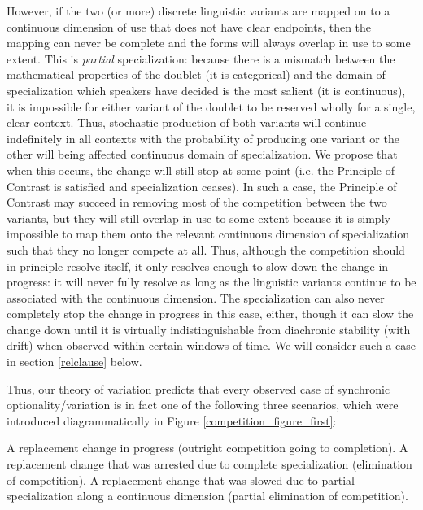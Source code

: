 However, if the two (or more) discrete linguistic variants are mapped on to a continuous dimension of use that does not have clear endpoints, then the mapping can never be complete and the forms will always overlap in use to some extent.
This is \textsl{partial} specialization: because there is a mismatch between the mathematical properties of the doublet (it is categorical) and the domain of specialization which speakers have decided is the most salient (it is continuous), it is impossible for either variant of the doublet to be reserved wholly for a single, clear context.
Thus, stochastic production of both variants will continue indefinitely in all contexts with the probability of producing one variant or the other will being affected continuous domain of specialization.
We propose that when this occurs, the change will still stop at some point (i.e. the Principle of Contrast is satisfied and specialization ceases).
In such a case, the Principle of Contrast may succeed in removing most of the competition between the two variants, but they will still overlap in use to some extent because it is simply impossible to map them onto the relevant continuous dimension of specialization such that they no longer compete at all.
Thus, although the competition should in principle resolve itself, it only resolves enough to slow down the change in progress: it will never fully resolve as long as the linguistic variants continue to be associated with the continuous dimension.
The specialization can also never completely stop the change in progress in this case, either, though it can slow the change down until it is virtually indistinguishable from diachronic stability (with drift) when observed within certain windows of time.
We will consider such a case in section \ref{relclause} below.

Thus, our theory of variation predicts that every observed case of synchronic optionality/variation is in fact one of the following three scenarios, which were introduced diagrammatically in Figure \ref{competition_figure_first}:

\begin{exe}
	\ex \begin{xlist}
		\ex A replacement change in progress (outright competition going to completion).
		\ex A replacement change that was arrested due to complete specialization (elimination of competition).
		\ex A replacement change that was slowed due to partial specialization along a continuous dimension (partial elimination of competition).
	\end{xlist}
\end{exe}



